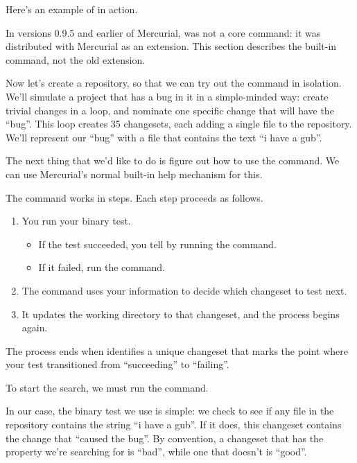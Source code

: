 Here's an example of  in action.

\begin{note}
  In versions 0.9.5 and earlier of Mercurial,  was not a
  core command: it was distributed with Mercurial as an extension.
  This section describes the built-in command, not the old extension.
\end{note}

Now let's create a repository, so that we can try out the
 command in isolation.
We'll simulate a project that has a bug in it in a simple-minded way:
create trivial changes in a loop, and nominate one specific change
that will have the ``bug''.  This loop creates 35 changesets, each
adding a single file to the repository.  We'll represent our ``bug''
with a file that contains the text ``i have a gub''.

The next thing that we'd like to do is figure out how to use the
 command.  We can use Mercurial's normal built-in help
mechanism for this.

The  command works in steps.  Each step proceeds as follows.
\begin{enumerate}
\item You run your binary test.
  \begin{itemize}
  \item If the test succeeded, you tell  by running the
     command.
  \item If it failed, run the  command.
  \end{itemize}
\item The command uses your information to decide which changeset to
  test next.
\item It updates the working directory to that changeset, and the
  process begins again.
\end{enumerate}
The process ends when  identifies a unique changeset
that marks the point where your test transitioned from ``succeeding''
to ``failing''.

To start the search, we must run the  command.

In our case, the binary test we use is simple: we check to see if any
file in the repository contains the string ``i have a gub''.  If it
does, this changeset contains the change that ``caused the bug''.  By
convention, a changeset that has the property we're searching for is
``bad'', while one that doesn't is ``good''.

